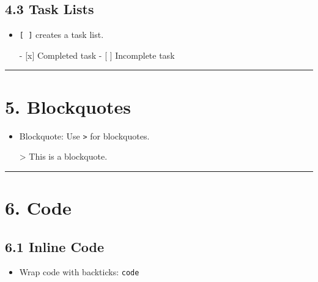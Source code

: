\documentclass[
]{book}
\newenvironment{Shaded}{\begin{snugshade}}{\end{snugshade}}
\newcommand{\AttributeTok}[1]{\textcolor[rgb]{0.13,0.29,0.53}{#1}}
\newcommand{\NormalTok}[1]{#1}
\newcommand{\SpecialStringTok}[1]{\textcolor[rgb]{0.31,0.60,0.02}{#1}}
\newcommand{\VariableTok}[1]{\textcolor[rgb]{0.00,0.00,0.00}{#1}}
\providecommand{\tightlist}{%
  \setlength{\itemsep}{0pt}\setlength{\parskip}{0pt}}
\theoremstyle{definition}
\theoremstyle{definition}
\theoremstyle{definition}
\theoremstyle{definition}
\theoremstyle{remark}
\begin{document}
\subsection{4.3 Task Lists}\label{task-lists}

\begin{itemize}
\item
  \texttt{{[}\ {]}} creates a task list.

\begin{Shaded}
\begin{Highlighting}[]
\SpecialStringTok{{-} }\VariableTok{[x]}\NormalTok{ Completed task}
\SpecialStringTok{{-} }\VariableTok{[ ]}\NormalTok{ Incomplete task}
\end{Highlighting}
\end{Shaded}
\end{itemize}

\begin{center}\rule{0.5\linewidth}{0.5pt}\end{center}

\section{5. Blockquotes}\label{blockquotes}

\begin{itemize}
\item
  Blockquote: Use \texttt{\textgreater{}} for blockquotes.

\begin{Shaded}
\begin{Highlighting}[]
\AttributeTok{\textgreater{} This is a blockquote.}
\end{Highlighting}
\end{Shaded}
\end{itemize}

\begin{center}\rule{0.5\linewidth}{0.5pt}\end{center}

\section{6. Code}\label{code}

\subsection{6.1 Inline Code}\label{inline-code}

\begin{itemize}
\tightlist
\item
  Wrap code with backticks: \texttt{\textasciigrave{}code\textasciigrave{}}
\end{itemize}
\end{document}
